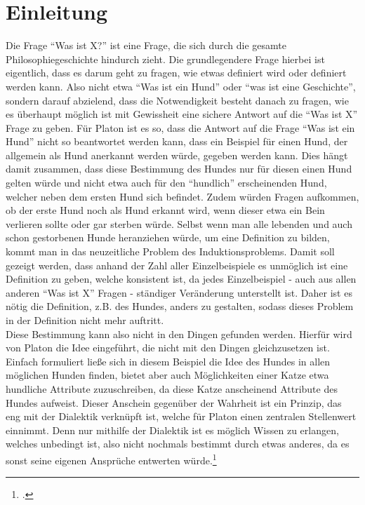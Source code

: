 \section{Einleitung}

Die Frage \enquote{Was ist X?} ist eine Frage, die sich durch die gesamte Philosophiegeschichte hindurch zieht. Die grundlegendere Frage hierbei ist eigentlich, dass es darum geht zu fragen, wie etwas definiert wird oder definiert werden kann. Also nicht etwa \enquote{Was ist ein Hund} oder \enquote{was ist eine Geschichte}, sondern darauf abzielend, dass die Notwendigkeit besteht danach zu fragen, wie es überhaupt möglich ist mit Gewissheit eine sichere Antwort auf die \enquote{Was ist X} Frage zu geben. Für Platon ist es so, dass die Antwort auf die Frage \enquote{Was ist ein Hund} nicht so beantwortet werden kann, dass ein Beispiel für einen Hund, der allgemein als Hund anerkannt werden würde, gegeben werden kann. Dies hängt damit zusammen, dass diese Bestimmung des Hundes nur für diesen einen Hund gelten würde und nicht etwa auch für den \enquote{hundlich} erscheinenden Hund, welcher neben dem ersten Hund sich befindet. Zudem würden Fragen aufkommen, ob der erste Hund noch als Hund erkannt wird, wenn dieser etwa ein Bein verlieren sollte oder gar sterben würde. Selbst wenn man alle lebenden und auch schon gestorbenen Hunde heranziehen würde, um eine Definition zu bilden, kommt man in das neuzeitliche Problem des Induktionsproblems. Damit soll gezeigt werden, dass anhand der Zahl aller Einzelbeispiele es unmöglich ist eine Definition zu geben, welche konsistent ist, da jedes Einzelbeispiel - auch aus allen anderen \enquote{Was ist X} Fragen - ständiger Veränderung unterstellt ist. Daher ist es nötig die Definition, z.B. des Hundes, anders zu gestalten, sodass dieses Problem in der Definition nicht mehr auftritt.\\
Diese Bestimmung kann also nicht in den Dingen gefunden werden. Hierfür wird von Platon die Idee eingeführt, die nicht mit den Dingen gleichzusetzen ist. Einfach formuliert ließe sich in diesem Beispiel die Idee des Hundes in allen möglichen Hunden finden, bietet aber auch Möglichkeiten einer Katze etwa hundliche Attribute zuzuschreiben, da diese Katze anscheinend Attribute des Hundes aufweist. Dieser Anschein gegenüber der Wahrheit ist ein Prinzip, das eng mit der Dialektik verknüpft ist, welche für Platon einen zentralen Stellenwert einnimmt. Denn nur mithilfe der Dialektik ist es möglich Wissen zu erlangen, welches unbedingt ist, also nicht nochmals bestimmt durch etwas anderes, da es sonst seine eigenen Ansprüche entwerten würde.\footcite[vgl.][S.83]{Staudacher} 

